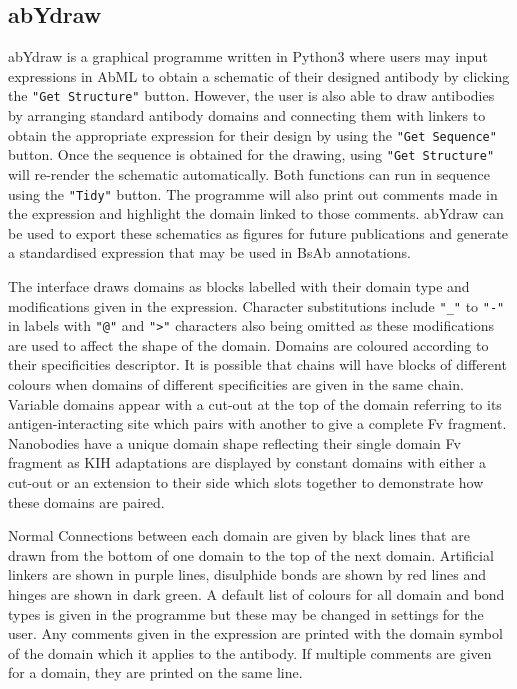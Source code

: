 \documentclass{article}
\begin{document}
\subsection{abYdraw}
abYdraw is a graphical programme written in Python3 where users may
input expressions in AbML to obtain a schematic of their designed
antibody by clicking the \verb|"Get Structure"| button. However, the user is
also able to draw antibodies by arranging standard antibody domains
and connecting them with linkers to obtain the appropriate expression
for their design by using the \verb|"Get Sequence"| button. Once the sequence
is obtained for the drawing, using \verb|"Get Structure"| will re-render the
schematic automatically. Both functions can run in sequence using the
\verb|"Tidy"| button. The programme will also print out comments made in the
expression and highlight the domain linked to those comments. abYdraw
can be used to export these schematics as figures for future
publications and generate a standardised expression that may be used
in BsAb annotations.  

The interface draws domains as blocks labelled with their domain type
and modifications given in the expression. Character substitutions
include \verb|"_"| to \verb|"-"| in labels with \verb|"@"| and
\verb|">"| characters also being omitted as these modifications are
used to affect the shape of the domain. Domains are coloured according
to their specificities descriptor. It is possible that chains will
have blocks of different colours when domains of different
specificities are given in the same chain. Variable domains appear
with a cut-out at the top of the domain referring to its
antigen-interacting site which pairs with another to give a complete
Fv fragment. Nanobodies have a unique domain shape reflecting their
single domain Fv fragment as KIH adaptations are displayed by constant
domains with either a cut-out or an extension to their side which
slots together to demonstrate how these domains are paired.

Normal Connections between each domain are given by black lines that
are drawn from the bottom of one domain to the top of the next
domain. Artificial linkers are shown in purple lines, disulphide bonds
are shown by red lines and hinges are shown in dark green. A default
list of colours for all domain and bond types is given in the
programme but these may be changed in settings for the user. Any
comments given in the expression are printed with the domain symbol of
the domain which it applies to the antibody. If multiple comments are
given for a domain, they are printed on the same line. 
\end{document}
